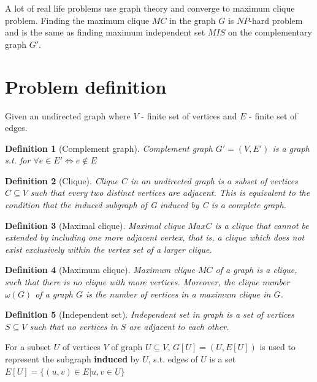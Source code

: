 A lot of real life problems use graph theory and converge to maximum clique problem. Finding the maximum clique $MC$ in the graph $G$ is $NP$-hard problem and is the same as finding maximum independent set $MIS$ on the complementary graph $G'$. 

\section{Problem definition}
Given an undirected graph \graphG where $V$ - finite set of vertices and $E$ - finite set of edges.

\newtheorem{definition}{Definition}[section]
\begin{definition} [Complement graph]
Complement graph $G'=(V,E')$ is a graph s.t. for $\forall e\in E' \iff e\notin E$ 
\end{definition}
\begin{definition} [Clique]
Clique $C$ in an undirected graph \graphG is a subset of vertices $C\subseteq V$ such that every two distinct vertices are adjacent. This is equivalent to the condition that the induced subgraph of G induced by C is a complete graph.
\end{definition}
\begin{definition} [Maximal clique]
Maximal clique $MaxC$ is a clique that cannot be extended by including one more adjacent vertex, that is, a clique which does not exist exclusively within the vertex set of a larger clique.
\end{definition}
\begin{definition} [Maximum clique]
Maximum clique $MC$ of a graph \graphG is a clique, such that there is no clique with more vertices. Moreover, the clique number $\omega(G)$ of a graph $G$ is the number of vertices in a maximum clique in $G$.
\end{definition}
\begin{definition}[Independent set]
Independent set in graph \graphG is a set of vertices $S \subseteq V$ such that no vertices in $S$ are adjacent to each other.
\end{definition}

For a subset $U$ of vertices $V$ of graph \graphG $U \subseteq V$, $G[U] = (U,E[U])$ is used to represent the subgraph \textbf{induced} by $U$, s.t. edges of $U$ is a set $E[U] = \{(u,v)\in E | u,v\in U\}$

